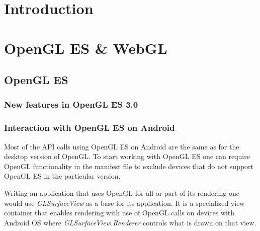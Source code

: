 \documentclass[a4paper,11pt]{article}
\renewenvironment{abstract}
{\itshape \small
  \begin{center}
  \bfseries \abstractname\vspace{-.5em}\vspace{0pt}
  \end{center}
  \list{}{
    \setlength{\leftmargin}{1.5cm}%
    \setlength{\rightmargin}{\leftmargin}%
  }%
  \item\relax}
{\endlist}
\begin{document}
\begin{abstract}
\label{Abstract}

\pagebreak




\section{Introduction} 



\pagebreak[3]
\section{OpenGL ES \& WebGL}


\pagebreak[3] 
\subsection{OpenGL ES}

\subsubsection{New features in OpenGL ES 3.0}


\subsubsection{Interaction with OpenGL ES on Android}
Most of the API calls using OpenGL ES on Android are the same as for the desktop version of OpenGL. 
To start working with OpenGL ES one can require OpenGL functionality in the manifest file to exclude devices that do not support OpenGL ES in the particular version.



Writing an application that uses OpenGL for all or part of its rendering one would use \emph{GLSurfaceView} \cite{android_glsurfaceview} as a base for its application.
It is a specialized view container that enables rendering with use of OpenGL calls on devices with Android OS where \emph{GLSurfaceView.Renderer} controls what is drawn on that view.


\end{abstract}
\end{document}
